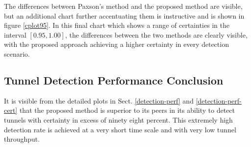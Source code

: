 \documentclass{llncs}
\begin{document}

\begin{figure}
\centering
{}
\end{figure}

The differences between Paxson's method and the proposed method are visible, but
an additional chart further accentuating them is instructive and is shown in
figure \ref{cplot95}. In this final chart which shows a range of certainties in
the interval $[0.95,1.00]$, the differences between the two methods are clearly
visible, with the proposed approach achieving a higher certainty in every
detection scenario.

\subsection{Tunnel Detection Performance Conclusion}
It is visible from the detailed plots in Sect. \ref{detection-perf} and
\ref{detection-perf-cert} that the proposed method is superior to its peers in
its ability to detect tunnels with certainty in excess of ninety eight percent.
This extremely high detection rate is achieved at a very short time scale and
with very low tunnel throughput.
\end{document}
